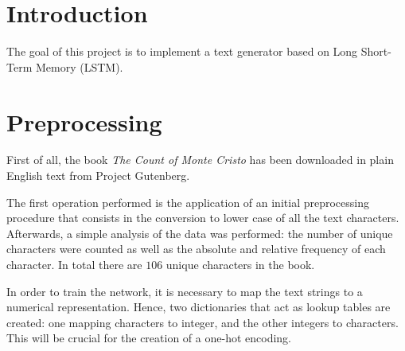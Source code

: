 \documentclass[a4paper,12pt]{article} %
\begin{document}
	

	\thispagestyle{empty}  
	\vspace{0.4cm}

	
	\section{Introduction}
	\label{section:intro}
	The goal of this project is to implement a text generator based on Long 
	Short-Term Memory (LSTM).
	
	\section{Preprocessing}
	\label{section:preprocessing}
	First of all, the book \textit{The Count of Monte Cristo} has been  
	downloaded in plain English text from Project Gutenberg.
	
	The first operation performed is the application of an initial 
	preprocessing procedure that consists in the conversion to lower case of 
	all the text characters. Afterwards, a simple analysis of the data was 
	performed: the number of unique characters were counted as well as the 
	absolute and relative frequency of each character. In total there are $106$ 
	unique characters in the book.\bigskip
	
	In order to train the network, it is necessary to map the text strings to a 
	numerical representation. Hence, two dictionaries that act as lookup tables 
	are created: one mapping characters to integer, and the other integers to 
	characters. This will be crucial for the creation of a one-hot encoding.
	
\end{document}
